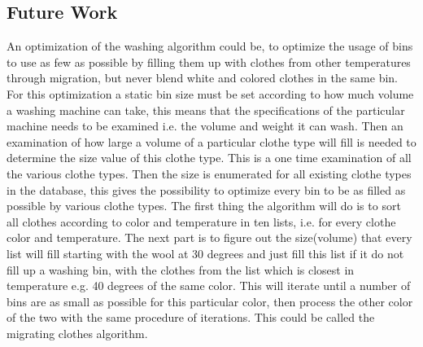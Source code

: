 \subsection{Future Work}
An optimization of the washing algorithm could be, to optimize the usage of bins to use as few as possible by filling them up with clothes from other temperatures through migration, but never blend white and colored clothes in the same bin. \\ For this optimization a static bin size must be set according to how much volume a washing machine can take, this means that the specifications of the particular machine needs to be examined i.e. the volume and weight it can wash. Then an examination of how large a volume of a particular clothe type will fill is needed to determine the size value of this clothe type. This is a one time examination of all the various clothe types. Then the size is enumerated for all existing clothe types in the database, this gives the possibility to optimize every bin to be as filled as possible by various clothe types. The first thing the algorithm will do is to sort all clothes according to color and temperature in ten lists, i.e. for every clothe color and temperature. The next part is to figure out the size(volume) that every list will fill starting with the wool at 30 degrees and just fill this list if it do not fill up a washing bin, with the clothes from the list which is closest in temperature e.g. 40 degrees  of the same color. This will iterate until a number of bins are as small as possible for this particular color, then process the other color of the two with the same procedure of iterations. This could be called the migrating clothes algorithm. 
